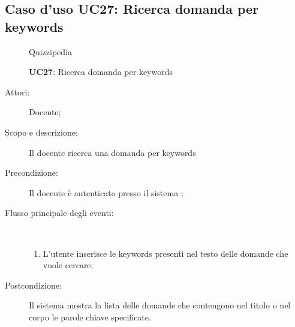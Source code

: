 \subsection{Caso d'uso UC27: Ricerca domanda per keywords}
	\begin{figure}[H]
		\centering
		\begin{resizedtikzpicture}{\textwidth}
		\begin{umlsystem}[x=0, fill=lightgray!20]{Quizzipedia}
		\end{umlsystem}
		\end{resizedtikzpicture}
		\caption{\textbf{UC27}: Ricerca domanda per keywords}
		\label{UC27}
	\end{figure}
\begin{description}
\item[Attori:] Docente;
\item[Scopo e descrizione:] Il docente  ricerca una domanda per keywords

      \item[Precondizione:] Il docente è autenticato presso il sistema
;

        \item[Flusso principale degli eventi:] \ 
 \begin{enumerate}
          \item L'utente inserisce le keywords presenti nel testo delle domande che vuole cercare;

      \end{enumerate}
    \item[Postcondizione:] Il sistema mostra la lista delle domande che contengono nel titolo o nel corpo le parole chiave specificate.
  \end{description}
\hypertarget{UC28}{}
